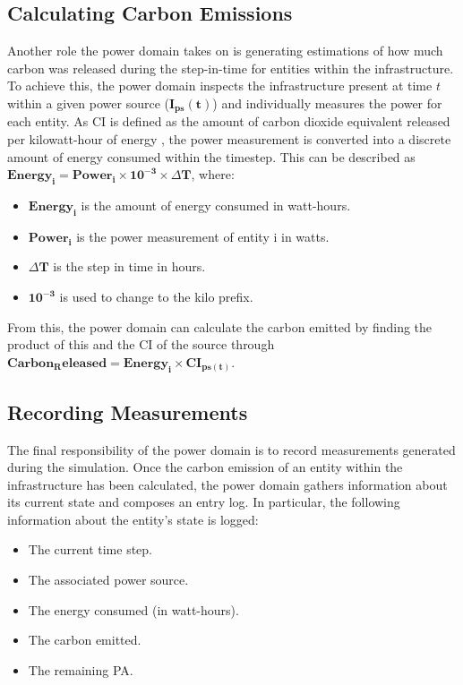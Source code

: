 \documentclass{l4proj}
\begin{document}
\subsection{Calculating Carbon Emissions}\label{subsec:carbon-released}
Another role the power domain takes on is generating estimations of how much carbon was released during the step-in-time for entities within the infrastructure.
To achieve this, the power domain inspects the infrastructure present at time $t$ within a given power source ($\mathbf{I_{ps}(t)}$) and individually measures the power for each entity.
As CI is defined as the amount of carbon dioxide equivalent released per kilowatt-hour of energy \citep{owid-electricity-mix}, the power measurement is converted into a discrete amount of energy consumed within the timestep.
This can be described as $\mathbf{Energy_{i}} = \mathbf{Power_{i}} \times \mathbf{10^{-3}} \times \mathbf{\varDelta T}$, where:
\begin{itemize}
    \item $\mathbf{Energy_{i}}$ is the amount of energy consumed in watt-hours.
    \item $\mathbf{Power_{i}}$ is the power measurement of entity i in watts.
    \item $\mathbf{\varDelta T}$ is the step in time in hours.
    \item $\mathbf{10^{-3}}$ is used to change to the kilo prefix.
\end{itemize}
From this, the power domain can calculate the carbon emitted by finding the product of this and the CI of the source through $\mathbf{Carbon_Released = Energy_{i} \times CI_{ps(t)}}$.

\subsection{Recording Measurements}\label{subsec:power-domain-recording-measurements}
The final responsibility of the power domain is to record measurements generated during the simulation.
Once the carbon emission of an entity within the infrastructure has been calculated, the power domain gathers information about its current state and composes an entry log.
In particular, the following information about the entity's state is logged:
\begin{itemize}
    \item The current time step.
    \item The associated power source.
    \item The energy consumed (in watt-hours).
    \item The carbon emitted.
    \item The remaining PA.
\end{itemize}
\end{document}
